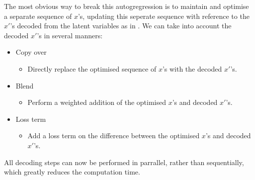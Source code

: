 The most obvious way to break this autogregression is to maintain and optimise a separate sequence of $x$'s, updating this seperate sequence with reference to the $x'$'s decoded from the latent variables as in . We can take into account the decoded $x'$'s in several manners:
\begin{itemize}
    \item Copy over
    \begin{itemize}
        \item Directly replace the optimised sequence of $x$'s with the decoded $x'$'s.
    \end{itemize}
    \item Blend
    \begin{itemize}
        \item Perform a weighted addition of the optimised $x$'s and decoded $x'$'s.
    \end{itemize}
    \item Loss term
    \begin{itemize}
        \item Add a loss term on the difference between the optimised $x$'s and decoded $x'$'s. 
    \end{itemize}
\end{itemize}

All decoding steps can now be performed in parrallel, rather than sequentially, which greatly reduces the computation time. 

